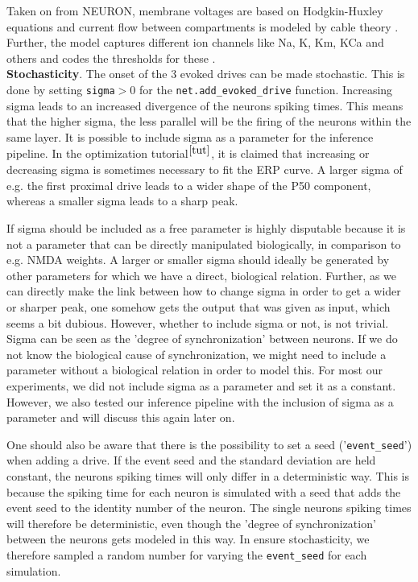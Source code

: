 \documentclass[12pt]{extreport}
\begin{document}
Taken on from NEURON, membrane voltages are based on Hodgkin-Huxley equations and current flow between compartments is modeled by cable theory \citep{neymotin2020human}. 
Further, the model captures different ion channels like Na, K, Km, KCa and others and codes the thresholds for these \citep{neymotin2020human}. \\

\textbf{Stochasticity}. The onset of the 3 evoked drives can be made stochastic. This is done by setting \texttt{sigma}$>0$ for the \texttt{net.add\_evoked\_drive} function. Increasing sigma leads to an increased divergence of the neurons spiking times. This means that the higher sigma, the less parallel will be the firing of the neurons within the same layer. It is possible to include sigma as a parameter for the inference pipeline. In the optimization tutorial$^{\ref{tut}}$, it is claimed that increasing or decreasing sigma is sometimes necessary to fit the ERP curve. A larger sigma of e.g. the first proximal drive leads to a wider shape of the P50 component, whereas a smaller sigma leads to a sharp peak. 

If sigma should be included as a free parameter is highly disputable because it is not a parameter that can be directly manipulated biologically, in comparison to e.g. NMDA weights. A larger or smaller sigma should ideally be generated by other parameters for which we have a direct, biological relation. Further, as we can directly make the link between how to change sigma in order to get a wider or sharper peak, one somehow gets the output that was given as input, which seems a bit dubious. However, whether to include sigma or not, is not trivial. Sigma can be seen as the 'degree of synchronization' between neurons. If we do not know the biological cause of synchronization, we might need to include a parameter without a biological relation in order to model this. 
For most our experiments, we did not include sigma as a parameter and set it as a constant. However, we also tested our inference pipeline with the inclusion of sigma as a parameter and will discuss this again later on.

One should also be aware that there is the possibility to set a seed ('\texttt{event\_seed}') when adding a drive. If the event seed and the standard deviation are held constant, the neurons spiking times will only differ in a deterministic way. This is because the spiking time for each neuron is simulated with a seed that adds the event seed to the identity number of the neuron. The single neurons spiking times will therefore be deterministic, even though the 'degree of synchronization' between the neurons gets modeled in this way. In ensure stochasticity, we therefore sampled a random number for varying the \texttt{event\_seed} for each simulation.   \\
\end{document}
